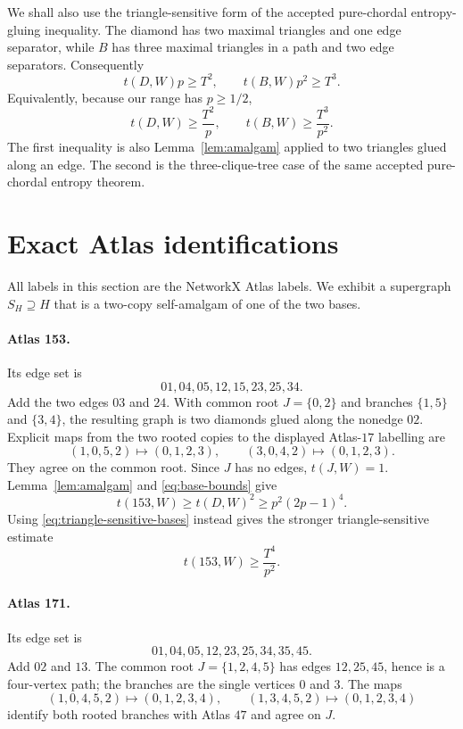 \documentclass[11pt]{article}
\begin{document}
We shall also use the triangle-sensitive form of the accepted
pure-chordal entropy-gluing inequality.  The diamond has two maximal
triangles and one edge separator, while $B$ has three maximal triangles
in a path and two edge separators.  Consequently
\begin{equation}\label{eq:triangle-sensitive-bases}
 t(D,W)p\geq T^2,
 \qquad
 t(B,W)p^2\geq T^3.
\end{equation}
Equivalently, because our range has $p\geq1/2$,
\[
 t(D,W)\geq\frac{T^2}{p},
 \qquad
 t(B,W)\geq\frac{T^3}{p^2}.
\]
The first inequality is also Lemma~\ref{lem:amalgam} applied to two
triangles glued along an edge.  The second is the three-clique-tree case
of the same accepted pure-chordal entropy theorem.

\section{Exact Atlas identifications}

All labels in this section are the NetworkX Atlas labels.  We exhibit a
supergraph $S_H\supseteq H$ that is a two-copy self-amalgam of one of the
two bases.

\paragraph{Atlas 153.}
Its edge set is
\[
 01,04,05,12,15,23,25,34.
\]
Add the two edges $03$ and $24$.  With common root $J=\{0,2\}$ and
branches $\{1,5\}$ and $\{3,4\}$, the resulting graph is two diamonds
glued along the nonedge $02$.  Explicit maps from the two rooted copies
to the displayed Atlas-$17$ labelling are
\[
 (1,0,5,2)\mapsto(0,1,2,3),
 \qquad
 (3,0,4,2)\mapsto(0,1,2,3).
\]
They agree on the common root.  Since $J$ has no edges, $t(J,W)=1$.
Lemma~\ref{lem:amalgam} and \eqref{eq:base-bounds} give
\begin{equation}\label{eq:153-lower}
 t(153,W)\geq t(D,W)^2
 \geq p^2(2p-1)^4.
\end{equation}
Using \eqref{eq:triangle-sensitive-bases} instead gives the stronger
triangle-sensitive estimate
\begin{equation}\label{eq:153-triangle-lower}
 t(153,W)\geq\frac{T^4}{p^2}.
\end{equation}

\paragraph{Atlas 171.}
Its edge set is
\[
 01,04,05,12,23,25,34,35,45.
\]
Add $02$ and $13$.  The common root
$J=\{1,2,4,5\}$ has edges $12,25,45$, hence is a four-vertex path;
the branches are the single vertices $0$ and $3$.  The maps
\[
 (1,0,4,5,2)\mapsto(0,1,2,3,4),
 \qquad
 (1,3,4,5,2)\mapsto(0,1,2,3,4)
\]
identify both rooted branches with Atlas $47$ and agree on $J$.
\end{document}
